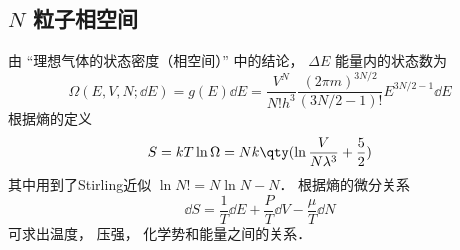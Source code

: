 
\begin{issues}
\issueDraft
\end{issues}

\subsection{$N$ 粒子相空间}

由 “理想气体的状态密度（相空间）” 中的结论， $\Delta E$ 能量内的状态数为
\begin{equation}
\Omega (E,V,N; \dd{E}) = g(E)\dd{E} = \frac{V^N}{N! h^3}\frac{(2\pi m)^{3N/2}}{(3N/2-1)!}E^{3N/2 - 1} \dd{E}
\end{equation}
根据熵的定义%
\begin{equation}
S = kT\ln \Omega  = Nk \qty(\ln \frac{V}{N\lambda^3} + \frac52)
\end{equation}
其中用到了Stirling近似%
$\ln N! = N\ln N - N$． 根据熵的微分关系
\begin{equation}
\dd{S} = \frac{1}{T} \dd{E} + \frac{P}{T} \dd{V} - \frac{\mu}{T} \dd{N}
\end{equation}
可求出温度， 压强， 化学势和能量之间的关系．
